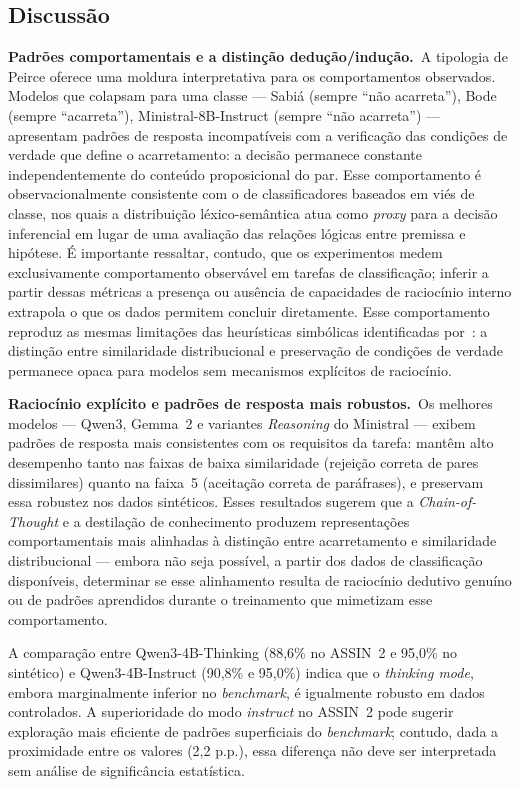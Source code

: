 \documentclass[12pt]{article}
\begin{document}
\subsection{Discussão}

\textbf{Padrões comportamentais e a distinção dedução/indução.}\ A tipologia
de Peirce oferece uma moldura interpretativa para os comportamentos observados.
Modelos que colapsam para uma classe --- Sabiá (sempre ``não acarreta''), Bode
(sempre ``acarreta''), Ministral-8B-Instruct (sempre ``não acarreta'') ---
apresentam padrões de resposta incompatíveis com a verificação das condições
de verdade que define o acarretamento: a decisão permanece constante
independentemente do conteúdo proposicional do par. Esse comportamento é
observacionalmente consistente com o de classificadores baseados em viés de
classe, nos quais a distribuição léxico-semântica atua como \emph{proxy} para
a decisão inferencial em lugar de uma avaliação das relações lógicas entre
premissa e hipótese. É importante ressaltar, contudo, que os experimentos
medem exclusivamente comportamento observável em tarefas de classificação;
inferir a partir dessas métricas a presença ou ausência de capacidades de
raciocínio interno extrapola o que os dados permitem concluir diretamente.
Esse comportamento reproduz as mesmas limitações das heurísticas simbólicas
identificadas por~\cite{stil}: a distinção entre similaridade distribucional e
preservação de condições de verdade permanece opaca para modelos sem
mecanismos explícitos de raciocínio.

\textbf{Raciocínio explícito e padrões de resposta mais robustos.}\ Os melhores
modelos --- Qwen3, Gemma~2 e variantes \emph{Reasoning} do Ministral ---
exibem padrões de resposta mais consistentes com os requisitos da tarefa:
mantêm alto desempenho tanto nas faixas de baixa similaridade (rejeição
correta de pares dissimilares) quanto na faixa~5 (aceitação correta de
paráfrases), e preservam essa robustez nos dados sintéticos. Esses resultados
sugerem que a \emph{Chain-of-Thought} e a destilação de conhecimento produzem
representações comportamentais mais alinhadas à distinção entre acarretamento
e similaridade distribucional --- embora não seja possível, a partir dos dados
de classificação disponíveis, determinar se esse alinhamento resulta de
raciocínio dedutivo genuíno ou de padrões aprendidos durante o treinamento que
mimetizam esse comportamento.

A comparação entre Qwen3-4B-Thinking (88,6\% no ASSIN~2 e 95,0\% no sintético)
e Qwen3-4B-Instruct (90,8\% e 95,0\%) indica que o \emph{thinking mode}, embora
marginalmente inferior no \emph{benchmark}, é igualmente robusto em dados
controlados. A superioridade do modo \emph{instruct} no ASSIN~2 pode sugerir
exploração mais eficiente de padrões superficiais do \emph{benchmark}; contudo,
dada a proximidade entre os valores (2,2 p.p.), essa diferença não deve ser
interpretada sem análise de significância estatística.
\end{document}
